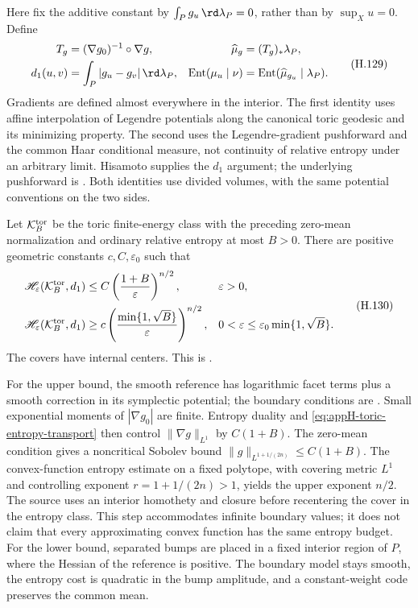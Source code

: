 Here fix the additive constant by $\int_Pg_u\,\rd\lambda_P=0$,
rather than by $\sup_Xu=0$. Define
\[
 \begin{aligned}
 T_g&=(\nabla g_0)^{-1}\circ\nabla g,
       &\widehat\mu_g&=(T_g)_*\lambda_P,\\
 d_1(u,v)&=\int_P|g_u-g_v|\,\rd\lambda_P,
       &\operatorname{Ent}(\mu_u\mid\nu)
          &=\operatorname{Ent}(\widehat\mu_{g_u}\mid\lambda_P).
 \end{aligned}
 \tag{H.129}\label{eq:appH-toric-entropy-transport}
\]
Gradients are defined almost everywhere in the interior. The first
identity uses affine interpolation of Legendre potentials along the
canonical toric geodesic and its minimizing property. The second
uses the Legendre-gradient pushforward and the common Haar
conditional measure, not continuity of relative entropy under an
arbitrary limit. Hisamoto \cite[\S9.1]{Hisamoto26MetricEntropyV1}
supplies the $d_1$ argument; the underlying pushforward is
\cite[Corollary~3.7]{CGSZ18ToricV1}. Both identities use divided
volumes, with the same potential conventions on the two sides.

\begin{theorem}\label{thm:appH-toric-metric-entropy}
Let $\mathcal K_B^{\rm tor}$ be the toric finite-energy class with
the preceding zero-mean normalization and ordinary relative entropy
at most $B>0$. There are positive geometric constants
$c,C,\varepsilon_0$ such that
\[
 \begin{aligned}
 \mathscr H_\varepsilon(\mathcal K_B^{\rm tor},d_1)
   &\leq C\left(\frac{1+B}{\varepsilon}\right)^{n/2},
       &&\varepsilon>0,\\
 \mathscr H_\varepsilon(\mathcal K_B^{\rm tor},d_1)
   &\geq c\left(\frac{\min\{1,\sqrt B\}}{\varepsilon}\right)^{n/2},
       &&0<\varepsilon\leq\varepsilon_0\min\{1,\sqrt B\}.
 \end{aligned}
 \tag{H.130}\label{eq:appH-toric-entropy-rate}
\]
The covers have internal centers. This is
\cite[Theorem~1.3]{Hisamoto26MetricEntropyV1}.
\end{theorem}

For the upper bound, the smooth reference has logarithmic facet terms
plus a smooth correction in its symplectic potential; the boundary
conditions are \cite[Theorems~2.5 and 2.8]{Abreu00SymplecticV1}.
Small exponential moments of $|\nabla g_0|$ are finite. Entropy
duality and \eqref{eq:appH-toric-entropy-transport} then control
$\|\nabla g\|_{L^1}$ by $C(1+B)$. The zero-mean condition gives a
noncritical Sobolev bound
$\|g\|_{L^{1+1/(2n)}}\leq C(1+B)$. The convex-function entropy
estimate \cite[Theorem~1(ii)]{GaoWellner17AuthorPublished} on a fixed
polytope, with covering metric $L^1$ and controlling exponent
$r=1+1/(2n)>1$, yields the upper exponent $n/2$.
The source uses an interior homothety and closure before recentering
the cover in the entropy class. This step accommodates infinite
boundary values; it does not claim that every approximating convex
function has the same entropy budget. For the lower bound, separated
bumps are placed in a fixed interior region of $P$, where the Hessian
of the reference is positive. The boundary model stays smooth, the
entropy cost is quadratic in the bump amplitude, and a constant-weight
code preserves the common mean.

